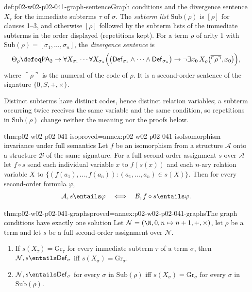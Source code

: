 \begin{hbdefinition}{def:p02-w02-p02-041-graph-sentence}{Graph conditions and the divergence sentence}
\(X_\tau\) for the immediate subterms \(\tau\) of \(\sigma\).  The
\emph{subterm list} \(\mathrm{Sub}(\rho)\) is \([\rho]\) for clauses 1--3,
and otherwise \([\rho]\) followed by the subterm lists of the immediate
subterms in the order displayed (repetitions kept).  For a term \(\rho\) of
arity \(1\) with \(\mathrm{Sub}(\rho)=[\sigma_1,\ldots,\sigma_n]\), the
\emph{divergence sentence} is
\[
 \Theta_\rho\defeq
 \mathsf{PA}_2\to\forall X_{\sigma_1}\cdots\forall X_{\sigma_n}
 \Bigl(\bigl(\mathsf{Def}_{\sigma_1}\land\cdots\land\mathsf{Def}_{\sigma_n}\bigr)
 \to\neg\exists x_0\,X_\rho\bigl(\overline{\ulcorner\rho\urcorner},x_0\bigr)\Bigr),
\]
where \(\overline{\ulcorner\rho\urcorner}\) is the numeral of the code of
\(\rho\).  It is a second-order sentence of the signature
\(\{0,S,+,\times\}\).
\end{hbdefinition}

Distinct subterms have distinct codes, hence distinct relation variables; a
subterm occurring twice receives the same variable and the same condition, so
repetitions in \(\mathrm{Sub}(\rho)\) change neither the meaning nor the
proofs below.

\begin{hblemma}{thm:p02-w02-p02-041-iso}{proved=annex:p02-w02-p02-041-iso}{Isomorphism invariance under full semantics}
Let \(f\) be an isomorphism from a structure \(\mathcal A\) onto a structure
\(\mathcal B\) of the same signature.  For a full second-order assignment
\(s\) over \(\mathcal A\) let \(f\circ s\) send each individual variable
\(x\) to \(f(s(x))\) and each \(n\)-ary relation variable \(X\) to
\(\{(f(a_1),\ldots,f(a_n)):(a_1,\ldots,a_n)\in s(X)\}\).  Then for every
second-order formula \(\varphi\),
\[
 \mathcal A,s\entails\varphi\quad\Longleftrightarrow\quad\mathcal B,f\circ s\entails\varphi .
\]
\end{hblemma}

\begin{hblemma}{thm:p02-w02-p02-041-graphs}{proved=annex:p02-w02-p02-041-graphs}{The graph conditions have exactly one solution}
Let \(\mathcal N=(\N,0,n\mapsto n+1,+,\times)\), let \(\rho\) be a term and
let \(s\) be a full second-order assignment over \(\mathcal N\).
\begin{enumerate}
 \item If \(s(X_\tau)=\mathrm{Gr}_\tau\) for every immediate subterm \(\tau\)
   of a term \(\sigma\), then
   \(\mathcal N,s\entails\mathsf{Def}_\sigma\) iff
   \(s(X_\sigma)=\mathrm{Gr}_\sigma\).
 \item \(\mathcal N,s\entails\mathsf{Def}_\sigma\) for every \(\sigma\) in
   \(\mathrm{Sub}(\rho)\) iff \(s(X_\sigma)=\mathrm{Gr}_\sigma\) for every
   \(\sigma\) in \(\mathrm{Sub}(\rho)\).
\end{enumerate}
\end{hblemma}

